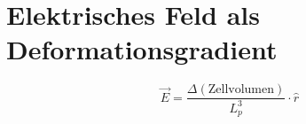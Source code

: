 \section{Elektrisches Feld als Deformationsgradient}
\[ \vec{E} = \frac{\Delta (\text{Zellvolumen})}{L_p^3} \cdot \hat{r} \]